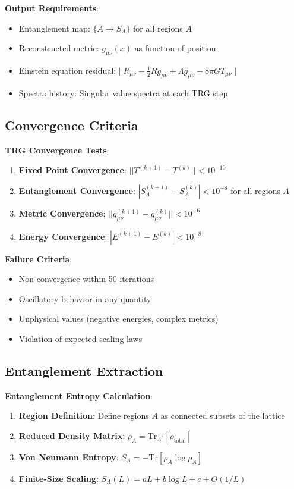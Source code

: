 \documentclass[11pt]{article}
\theoremstyle{definition}
\begin{document}
\textbf{Output Requirements}:
\begin{itemize}
\item Entanglement map: $\{A \to S_A\}$ for all regions $A$
\item Reconstructed metric: $g_{\mu\nu}(x)$ as function of position
\item Einstein equation residual: $||R_{\mu\nu} - \frac{1}{2}Rg_{\mu\nu} + \Lambda g_{\mu\nu} - 8\pi G T_{\mu\nu}||$
\item Spectra history: Singular value spectra at each TRG step
\end{itemize}

\subsection{Convergence Criteria}

\textbf{TRG Convergence Tests}:
\begin{enumerate}
\item \textbf{Fixed Point Convergence}: $||T^{(k+1)} - T^{(k)}|| < 10^{-10}$
\item \textbf{Entanglement Convergence}: $|S_A^{(k+1)} - S_A^{(k)}| < 10^{-8}$ for all regions $A$
\item \textbf{Metric Convergence}: $||g_{\mu\nu}^{(k+1)} - g_{\mu\nu}^{(k)}|| < 10^{-6}$
\item \textbf{Energy Convergence}: $|E^{(k+1)} - E^{(k)}| < 10^{-8}$
\end{enumerate}

\textbf{Failure Criteria}:
\begin{itemize}
\item Non-convergence within 50 iterations
\item Oscillatory behavior in any quantity
\item Unphysical values (negative energies, complex metrics)
\item Violation of expected scaling laws
\end{itemize}

\subsection{Entanglement Extraction}

\textbf{Entanglement Entropy Calculation}:
\begin{enumerate}
\item \textbf{Region Definition}: Define regions $A$ as connected subsets of the lattice
\item \textbf{Reduced Density Matrix}: $\rho_A = \text{Tr}_{A^c}[\rho_{\text{total}}]$
\item \textbf{Von Neumann Entropy}: $S_A = -\text{Tr}[\rho_A \log \rho_A]$
\item \textbf{Finite-Size Scaling}: $S_A(L) = aL + b\log L + c + O(1/L)$
\end{enumerate}
\end{document}

